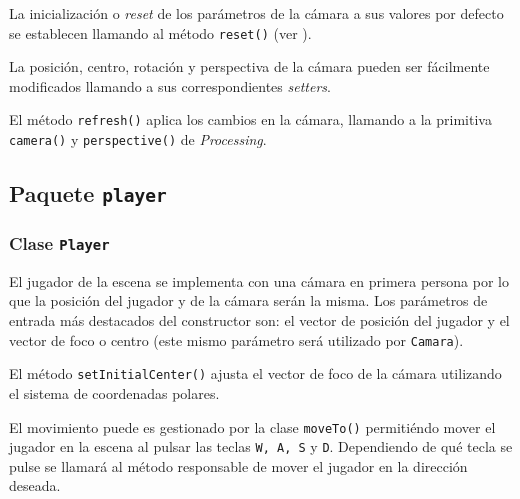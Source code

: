 \documentclass[10pt,a4paper]{report}
\begin{document}
	
	
	La inicialización o \textit{reset} de los parámetros de la cámara a sus valores por defecto se establecen llamando al método \texttt{reset()} (ver \cite{processing-reference}).
	
	
	
	La posición, centro, rotación y perspectiva de la cámara pueden ser fácilmente modificados llamando a sus correspondientes \textit{setters}.
	
	
	
	El método \texttt{refresh()} aplica los cambios en la cámara, llamando a la primitiva \texttt{camera()} y \texttt{perspective()} de \textit{Processing}.
	
	
	
	\subsection{Paquete \texttt{player}}
	\subsubsection{Clase \texttt{Player}}
	El jugador de la escena se implementa con una cámara en primera persona por lo que la posición del jugador y de la cámara serán la misma. Los parámetros de entrada más destacados del constructor son: el vector de posición del jugador y el vector de foco o centro (este mismo parámetro será utilizado por \texttt{Camara}). 
	
	El método \texttt{setInitialCenter()} ajusta el vector de foco de la cámara utilizando el sistema de coordenadas polares.
	
	
	
	El movimiento puede es gestionado por la clase \texttt{moveTo()} permitiéndo mover el jugador en la escena al pulsar las teclas \texttt{W, A, S} y \texttt{D}. Dependiendo de qué tecla se pulse se llamará al método responsable de mover el jugador en la dirección deseada.
	
	
	
\end{document}
